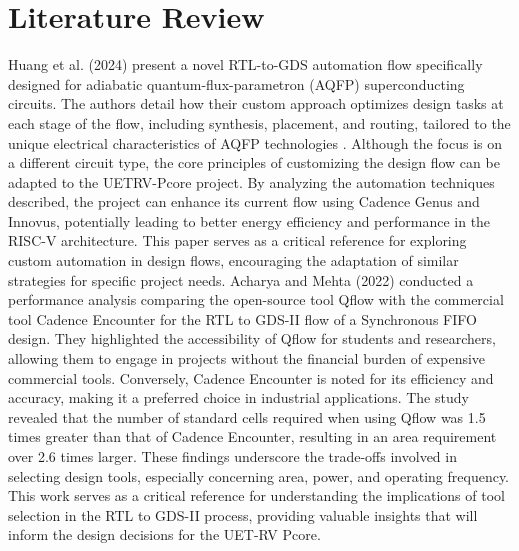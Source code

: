
\chapter{Literature Review}
\label{Chapter3}

Huang et al. (2024) present a novel RTL-to-GDS automation flow specifically designed for adiabatic quantum-flux-parametron (AQFP) superconducting circuits. The authors detail how their custom approach optimizes design tasks at each stage of the flow, including synthesis, placement, and routing, tailored to the unique electrical characteristics of AQFP technologies \cite{huang2024superflow}. Although the focus is on a different circuit type, the core principles of customizing the design flow can be adapted to the UETRV-Pcore project. By analyzing the automation techniques described, the project can enhance its current flow using Cadence Genus and Innovus, potentially leading to better energy efficiency and performance in the RISC-V architecture. This paper serves as a critical reference for exploring custom automation in design flows, encouraging the adaptation of similar strategies for specific project needs.
Acharya and Mehta (2022) conducted a performance analysis comparing the open-source tool Qflow with the commercial tool Cadence Encounter for the RTL to GDS-II flow of a Synchronous FIFO design. They highlighted the accessibility of Qflow for students and researchers, allowing them to engage in projects without the financial burden of expensive commercial tools. Conversely, Cadence Encounter is noted for its efficiency and accuracy, making it a preferred choice in industrial applications. The study revealed that the number of standard cells required when using Qflow was 1.5 times greater than that of Cadence Encounter, resulting in an area requirement over 2.6 times larger. These findings underscore the trade-offs involved in selecting design tools, especially concerning area, power, and operating frequency. This work serves as a critical reference for understanding the implications of tool selection in the RTL to GDS-II process, providing valuable insights that will inform the design decisions for the UET-RV Pcore.

